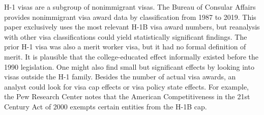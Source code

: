 \documentclass[review]{elsarticle}
\begin{document}
H-1 visas are a subgroup of nonimmigrant visas.
The Bureau of Consular Affairs provides nonimmigrant visa award data by classification
from 1987 to 2019\cite{bureauof_2020}.
This paper exclusively uses the most relevant H-1B visa award numbers,
but reanalysis with other visa classifications could yield statistically significant findings.
The prior H-1 visa was also a merit worker visa, but it had no formal definition of merit.
It is plausible that the college-educated effect informally existed before the 1990 legislation.
One might also find small but significant effects by looking into visas outside the H-1 family.
Besides the number of actual visa awards,
an analyst could look for visa cap effects or visa policy state effects.
For example, the Pew Research Center notes that the American Competitiveness in the 21st Century Act of 2000 exempts certain entities from the H-1B cap\cite{ruiz2017key}.
% 
% 
\end{document}

